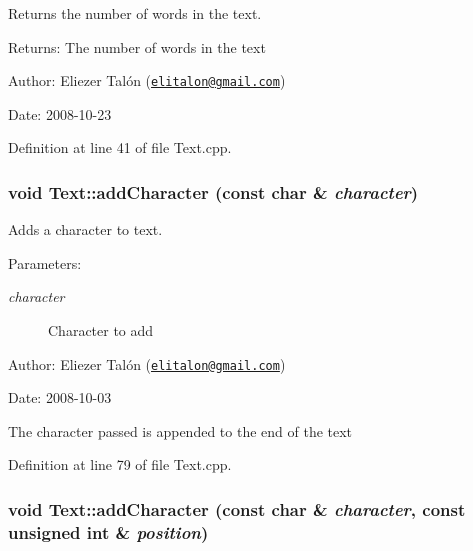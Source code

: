 Returns the number of words in the text. 

\begin{Desc}
\item[Returns:]The number of words in the text\end{Desc}
\begin{Desc}
\item[Author:]Eliezer Talón (\href{mailto:elitalon@gmail.com}{\tt elitalon@gmail.com}) \end{Desc}
\begin{Desc}
\item[Date:]2008-10-23 \end{Desc}


Definition at line 41 of file Text.cpp.\hypertarget{class_text_6e6da63c90af68639adc7dd1336f6bf9}{
\subsubsection[addCharacter]{\setlength{\rightskip}{0pt plus 5cm}void Text::addCharacter (const char \& {\em character})}}
\label{class_text_6e6da63c90af68639adc7dd1336f6bf9}


Adds a character to text. 

\begin{Desc}
\item[Parameters:]
\begin{description}
\item[{\em character}]Character to add\end{description}
\end{Desc}
\begin{Desc}
\item[Author:]Eliezer Talón (\href{mailto:elitalon@gmail.com}{\tt elitalon@gmail.com}) \end{Desc}
\begin{Desc}
\item[Date:]2008-10-03\end{Desc}
The character passed is appended to the end of the text 

Definition at line 79 of file Text.cpp.\hypertarget{class_text_fdd11ad0c90ca483d4cff3d74a64da9e}{
\subsubsection[addCharacter]{\setlength{\rightskip}{0pt plus 5cm}void Text::addCharacter (const char \& {\em character}, \/  const unsigned int \& {\em position})}}
\label{class_text_fdd11ad0c90ca483d4cff3d74a64da9e}


